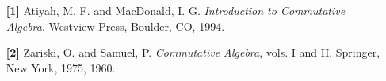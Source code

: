 {\small
 
\begin{itemize}
 
\item[\textbf{[1]}] %
Atiyah, M. F.  and MacDonald, I. G. \textit{Introduction to
Commutative Algebra}. Westview Press, Boulder, CO, 1994.
 


\item[\textbf{[2]}] %
Zariski, O. and Samuel, P. \textit{Commutative Algebra}, vols. I
and II. Springer, New York, 1975, 1960. 
 
\end{itemize}
}
 
\sagesection
 


